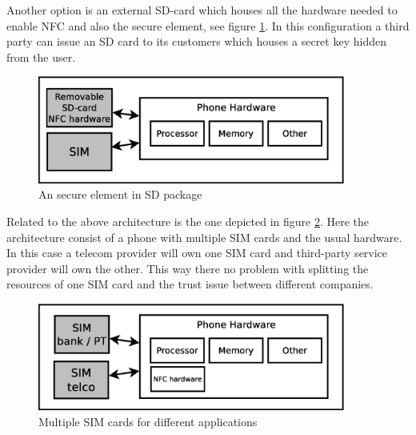 
Another option is an external SD-card which houses all the hardware needed to enable NFC and also the secure element, see figure \ref{fig:modular_se}.
In this configuration a third party can issue an SD card to its customers which houses a secret key hidden from the user.

\begin{figure}
\includegraphics[width=0.9\textwidth]{images/SD_NFC}
\caption[SE in SD package]
{
An secure element in SD package
}
\label{fig:modular_se}
\end{figure}

Related to the above architecture is the one depicted in figure \ref{fig:multi_sim}.
Here the architecture consist of a phone with multiple SIM cards and the usual hardware.
In this case a telecom provider will own one SIM card and third-party service provider will own the other.
This way there no problem with splitting the resources of one SIM card and the trust issue between different companies.
\begin{figure}
\includegraphics[width=0.9\textwidth]{images/meerdere_sims}
\caption[Multiple SIM cards]
{
Multiple SIM cards for different applications
}
\label{fig:multi_sim}
\end{figure}

